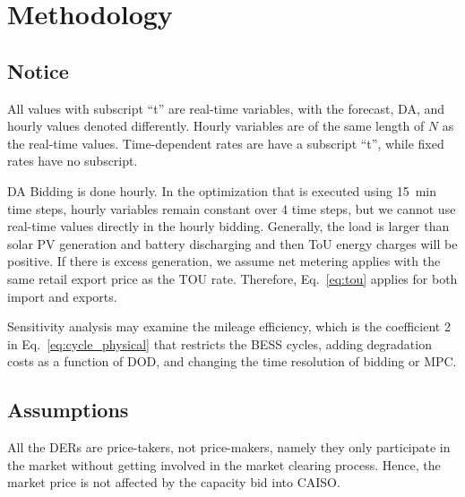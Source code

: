 \documentclass[conference]{IEEEtran}
\begin{document}















\section{Methodology}

\subsection{Notice}
All values with subscript ``t'' are real-time variables, with the forecast, DA, and hourly values denoted differently. Hourly variables are of the same length of $N$ as the real-time values. Time-dependent rates are have a subscript ``t'', while fixed rates have no subscript.

DA Bidding is done hourly. In the optimization that is executed using 15~min time steps, hourly variables remain constant over 4 time steps, but we cannot use real-time values directly in the hourly bidding. Generally, the load is larger than solar PV generation and battery discharging and then ToU energy charges will be positive. If there is excess generation, we assume net metering applies with the same retail export price as the TOU rate. Therefore, Eq.~\ref{eq:tou} applies for both import and exports.

Sensitivity analysis may examine the mileage efficiency, which is the coefficient 2 in Eq.~\ref{eq:cycle_physical} that restricts the BESS cycles, adding degradation costs as a function of DOD, and changing the time resolution of bidding or MPC.

\subsection{Assumptions}
All the DERs are price-takers, not price-makers, namely they only participate in the market without getting involved in the market clearing process. Hence, the market price is not affected by the capacity bid into CAISO.
\end{document}
